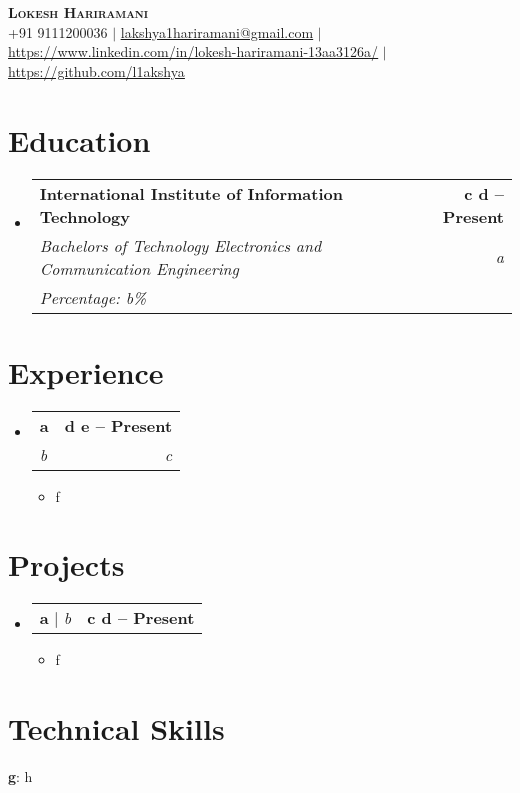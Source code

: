\documentclass[letterpaper,11pt]{article}
\makeatletter
\newcommand{\resumeItem}[1]{
  \item\small{
    {#1 \vspace{-2pt}}
  }
}
\newcommand{\resumeEducation}[5]{
  \vspace{-2pt}\item
    \begin{tabular*}{\textwidth}{l@{\extracolsep{\fill}}r}
      \textbf{#1} & \textbf{#4} \\
      \textit{\small#3} & \textit{#2} \\
      \textit{#5} & \\
    \end{tabular*}\vspace{-7pt}
}
\newcommand{\resumeSubheading}[4]{
  \vspace{-2pt}\item
    \begin{tabular*}{\textwidth}{l@{\extracolsep{\fill}}r}
      \textbf{#1} & \textbf{#2} \\
      \textit{\small#3} & \textit{#4} \\
    \end{tabular*}\vspace{-7pt}
}
\newcommand{\resumeProjectHeading}[2]{
    \item
    \begin{tabular*}{0.97\textwidth}{l@{\extracolsep{\fill}}r}
      \small#1 & \textbf{#2} \\
    \end{tabular*}\vspace{-7pt}
}
\newcommand{\resumeSubHeadingListStart}{\begin{itemize}[leftmargin=0.15in, label={}]}
\newcommand{\resumeSubHeadingListEnd}{\end{itemize}}
\newcommand{\resumeItemListStart}{\begin{itemize}}
\newcommand{\resumeItemListEnd}{\end{itemize}\vspace{-5pt}}
\makeatother
\begin{document}

\begin{center}
    \textbf{\Huge \scshape Lokesh Hariramani} \\ \vspace{1pt}
    \small +91 9111200036 $|$ \href{mailto:x@x.com}{\underline{lakshya1hariramani@gmail.com}} $|$ 
    \href{}{\underline{https://www.linkedin.com/in/lokesh-hariramani-13aa3126a/}} $|$
    \href{}{\underline{https://github.com/l1akshya}}
\end{center}

\section{Education}
\resumeSubHeadingListStart
    \resumeEducation
      {International Institute of Information Technology}
      {a}
      {Bachelors of Technology Electronics and Communication Engineering }
      {c d -- Present}
      {Percentage: b\%}
\resumeSubHeadingListEnd



\section{Experience}
\resumeSubHeadingListStart
    \resumeSubheading
      {a}{d e -- Present}
      {b}{c}
      \resumeItemListStart
        \resumeItem{f}
      \resumeItemListEnd
\resumeSubHeadingListEnd


\section{Projects}
    \resumeSubHeadingListStart
      \resumeProjectHeading
          {\textbf{a} $|$ \emph{b}}{c d -- Present}
          \resumeItemListStart
            \resumeItem{f}
          \resumeItemListEnd
    \resumeSubHeadingListEnd

%
\section{Technical Skills}
  \begin{itemize}[leftmargin=0.15in, label={}]
    \small{\item{
     \textbf{g}{: h} 
    }}
 \end{itemize}


\end{document}
